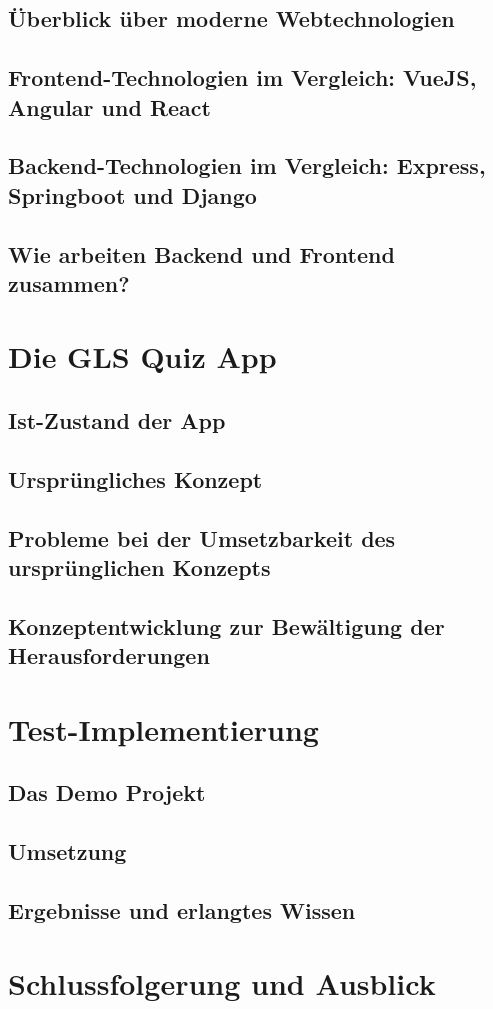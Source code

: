 \documentclass[biblatex]{lni}
\begin{document}
\subsection{Überblick über moderne Webtechnologien}
\subsection{Frontend-Technologien im Vergleich: VueJS, Angular und React}
\subsection{Backend-Technologien im Vergleich: Express, Springboot und Django}
\subsection{Wie arbeiten Backend und Frontend zusammen?}

\section{Die GLS Quiz App}
\subsection{Ist-Zustand der App}
\subsection{Ursprüngliches Konzept}
\subsection{Probleme bei der Umsetzbarkeit des ursprünglichen Konzepts}
\subsection{Konzeptentwicklung zur Bewältigung der Herausforderungen}

\section{Test-Implementierung}
\subsection{Das Demo Projekt}
\subsection{Umsetzung}
\subsection{Ergebnisse und erlangtes Wissen}

\section{Schlussfolgerung und Ausblick}

\newpage
\printbibliography
\end{document}
